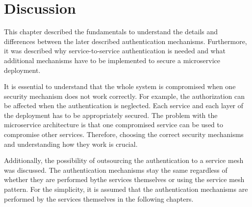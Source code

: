 \section{Discussion}
This chapter described the fundamentals to understand the details and differences between the later described authentication mechanisms.
Furthermore, it was described why service-to-service authentication is needed and what additional mechanisms have to be implemented to secure a microservice deployment.

It is essential to understand that the whole system is compromised when one security mechanism does not work correctly.
For example, the authorization can be affected when the authentication is neglected.
Each service and each layer of the deployment has to be appropriately secured.
The problem with the microservice architecture is that one compromised service can be used to compromise other services.
Therefore, choosing the correct security mechanisms and understanding how they work is crucial. 

Additionally, the possibility of outsourcing the authentication to a service mesh was discussed.
The authentication mechanisms stay the same regardless of whether they are performed bythe services themselves or using the service mesh pattern.
For the simplicity, it is assumed that the authentication mechanisms are performed by the services themselves in the following chapters.

